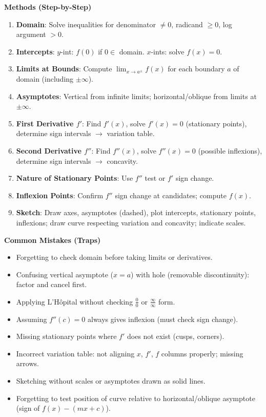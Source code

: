 \documentclass[11pt]{article}
\begin{document}
\begin{bilan}
\textbf{Methods (Step-by-Step)}
\begin{enumerate}
    \item \textbf{Domain}: Solve inequalities for denominator $\neq0$, radicand $\ge0$, log argument $>0$.
    \item \textbf{Intercepts}: $y$-int: $f(0)$ if $0\in$ domain. $x$-ints: solve $f(x)=0$.
    \item \textbf{Limits at Bounds}: Compute $\lim_{x\to a^{\pm}}f(x)$ for each boundary $a$ of domain (including $\pm\infty$).
    \item \textbf{Asymptotes}: Vertical from infinite limits; horizontal/oblique from limits at $\pm\infty$.
    \item \textbf{First Derivative $f'$}: Find $f'(x)$, solve $f'(x)=0$ (stationary points), determine sign intervals $\to$ variation table.
    \item \textbf{Second Derivative $f''$}: Find $f''(x)$, solve $f''(x)=0$ (possible inflexions), determine sign intervals $\to$ concavity.
    \item \textbf{Nature of Stationary Points}: Use $f''$ test or $f'$ sign change.
    \item \textbf{Inflexion Points}: Confirm $f''$ sign change at candidates; compute $f(x)$.
    \item \textbf{Sketch}: Draw axes, asymptotes (dashed), plot intercepts, stationary points, inflexions; draw curve respecting variation and concavity; indicate scales.
\end{enumerate}

\textbf{Common Mistakes (Traps)}
\begin{itemize}
    \item Forgetting to check domain before taking limits or derivatives.
    \item Confusing vertical asymptote ($x=a$) with hole (removable discontinuity): factor and cancel first.
    \item Applying L'Hôpital without checking $\frac{0}{0}$ or $\frac{\infty}{\infty}$ form.
    \item Assuming $f''(c)=0$ always gives inflexion (must check sign change).
    \item Missing stationary points where $f'$ does not exist (cusps, corners).
    \item Incorrect variation table: not aligning $x$, $f'$, $f$ columns properly; missing arrows.
    \item Sketching without scales or asymptotes drawn as solid lines.
    \item Forgetting to test position of curve relative to horizontal/oblique asymptote (sign of $f(x)-(mx+c)$).
\end{itemize}


\end{bilan}
\end{document}
